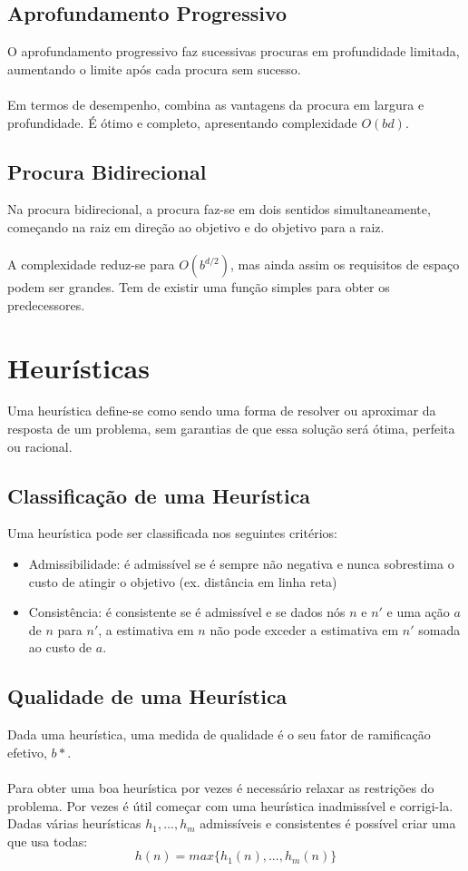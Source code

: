 \documentclass[10pt,a4paper]{report}
\begin{document}
\subsection{Aprofundamento Progressivo}
O aprofundamento progressivo faz sucessivas procuras em profundidade limitada, aumentando o limite após cada procura sem sucesso.\\
\\
Em termos de desempenho, combina as vantagens da procura em largura e profundidade. É ótimo e completo, apresentando complexidade $O(bd)$.
\subsection{Procura Bidirecional}
Na procura bidirecional, a procura faz-se em dois sentidos simultaneamente, começando na raiz em direção ao objetivo e do objetivo para a raiz.\\
\\
A complexidade reduz-se para $O(b^{d/2})$, mas ainda assim os requisitos de espaço podem ser grandes. Tem de existir uma função simples para obter os predecessores.
\section{Heurísticas}
Uma heurística define-se como sendo uma forma de resolver ou aproximar da resposta de um problema, sem garantias de que essa solução será ótima, perfeita ou racional.
\subsection{Classificação de uma Heurística}
Uma heurística pode ser classificada nos seguintes critérios:
\begin{itemize}
\item Admissibilidade: é admissível se é sempre não negativa e nunca sobrestima o custo de atingir o objetivo (ex. distância em linha reta)
\item Consistência: é consistente se é admissível e se dados nós $n$ e $n'$ e uma ação $a$ de $n$ para $n'$, a estimativa em $n$ não pode exceder a estimativa em $n'$ somada ao custo de $a$.
\end{itemize}
\subsection{Qualidade de uma Heurística}
Dada uma heurística, uma medida de qualidade é o seu fator de ramificação efetivo, $b*$.\\
\\
Para obter uma boa heurística por vezes é necessário relaxar as restrições do problema. Por vezes é útil começar com uma heurística inadmissível e corrigi-la. Dadas várias heurísticas $h_1, ..., h_m$ admissíveis e consistentes é possível criar uma que usa todas:
$$
h(n) = max \{h_1(n), ..., h_m(n)\}
$$
\end{document}
